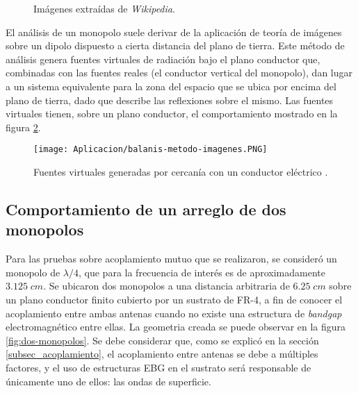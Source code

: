 \begin{figure}[H]
	\centering 
	\hspace{30pt}
	\caption{Imágenes extraídas de \textit{Wikipedia}.}
	\label{fig:monopolos}
\end{figure}


El análisis de un monopolo suele derivar de la aplicación de teoría de imágenes sobre un dipolo dispuesto a cierta distancia del plano de tierra. Este método de análisis genera fuentes virtuales de radiación bajo el plano conductor que, combinadas con las fuentes reales (el conductor vertical del monopolo), dan lugar a un sistema equivalente para la zona del espacio que se ubica por encima del plano de tierra, dado que describe las reflexiones sobre el mismo. Las fuentes virtuales tienen, sobre un plano conductor, el comportamiento mostrado en la figura \ref{fig:fuentes-virtuales}.


\begin{figure}[h]
	\centering
	\texttt{[image: Aplicacion/balanis-metodo-imagenes.PNG]}
	\caption{Fuentes virtuales generadas por cercanía con un conductor eléctrico \cite{Balanis:Theory}.}
	\label{fig:fuentes-virtuales}
\end{figure}

\subsection{Comportamiento de un arreglo de dos monopolos}

Para las pruebas sobre acoplamiento mutuo que se realizaron, se consideró un monopolo de $\lambda/4$, que para la frecuencia de interés es de aproximadamente $3.125\;cm$. Se ubicaron dos monopolos a una distancia arbitraria de $6.25\; cm$ sobre un plano conductor finito cubierto por un sustrato de FR-4, a fin de conocer el acoplamiento entre ambas antenas cuando no existe una estructura de \textit{bandgap} electromagnético entre ellas. La geometria creada se puede observar en la figura \ref{fig:dos-monopolos}. Se debe considerar que, como se explicó en la sección \ref{subsec_acoplamiento}, el acoplamiento entre antenas se debe a múltiples factores, y el uso de estructuras EBG en el sustrato será responsable de únicamente uno de ellos: las ondas de superficie.

